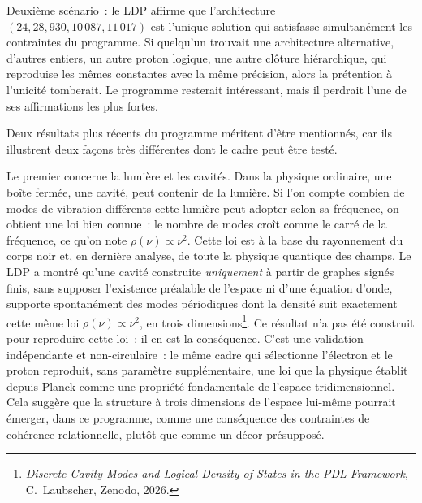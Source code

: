 \documentclass[12pt, a4paper, openright]{book}
\begin{document}
\medskip

Deuxième scénario~: le LDP affirme que l'architecture $(24, 28, 930, 10\,087, 11\,017)$ est l'unique solution qui satisfasse simultanément les contraintes du programme. Si quelqu'un trouvait une architecture alternative, d'autres entiers, un autre proton logique, une autre clôture hiérarchique, qui reproduise les mêmes constantes avec la même précision, alors la prétention à l'unicité tomberait. Le programme resterait intéressant, mais il perdrait l'une de ses affirmations les plus fortes.

\medskip

Deux résultats plus récents du programme méritent d'être mentionnés, car ils illustrent deux façons très différentes dont le cadre peut être testé.

\medskip

Le premier concerne la lumière et les cavités. Dans la physique ordinaire, une boîte fermée, une cavité, peut contenir de la lumière. Si l'on compte combien de modes de vibration différents cette lumière peut adopter selon sa fréquence, on obtient une loi bien connue~: le nombre de modes croît comme le carré de la fréquence, ce qu'on note $\rho(\nu) \propto \nu^2$. Cette loi est à la base du rayonnement du corps noir et, en dernière analyse, de toute la physique quantique des champs. Le LDP a montré qu'une cavité construite \emph{uniquement} à partir de graphes signés finis, sans supposer l'existence préalable de l'espace ni d'une équation d'onde, supporte spontanément des modes périodiques dont la densité suit exactement cette même loi $\rho(\nu) \propto \nu^2$, en trois dimensions\footnote{\textit{Discrete Cavity Modes and Logical Density of States in the PDL Framework}, C.~Laubscher, Zenodo, 2026.}. Ce résultat n'a pas été construit pour reproduire cette loi~: il en est la conséquence. C'est une validation indépendante et non-circulaire~: le même cadre qui sélectionne l'électron et le proton reproduit, sans paramètre supplémentaire, une loi que la physique établit depuis Planck comme une propriété fondamentale de l'espace tridimensionnel. Cela suggère que la structure à trois dimensions de l'espace lui-même pourrait émerger, dans ce programme, comme une conséquence des contraintes de cohérence relationnelle, plutôt que comme un décor présupposé.

\medskip
\end{document}
